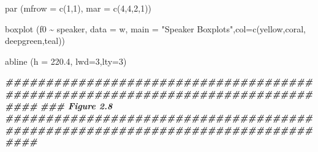 \documentclass[
]{book}
\newenvironment{Shaded}{\begin{snugshade}}{\end{snugshade}}
\newcommand{\AttributeTok}[1]{\textcolor[rgb]{0.77,0.63,0.00}{#1}}
\newcommand{\DecValTok}[1]{\textcolor[rgb]{0.00,0.00,0.81}{#1}}
\newcommand{\DocumentationTok}[1]{\textcolor[rgb]{0.56,0.35,0.01}{\textbf{\textit{#1}}}}
\newcommand{\FloatTok}[1]{\textcolor[rgb]{0.00,0.00,0.81}{#1}}
\newcommand{\FunctionTok}[1]{\textcolor[rgb]{0.00,0.00,0.00}{#1}}
\newcommand{\NormalTok}[1]{#1}
\newcommand{\SpecialCharTok}[1]{\textcolor[rgb]{0.00,0.00,0.00}{#1}}
\newcommand{\StringTok}[1]{\textcolor[rgb]{0.31,0.60,0.02}{#1}}
\begin{document}
\begin{Shaded}
\begin{Highlighting}[]
\FunctionTok{par}\NormalTok{ (}\AttributeTok{mfrow =} \FunctionTok{c}\NormalTok{(}\DecValTok{1}\NormalTok{,}\DecValTok{1}\NormalTok{), }\AttributeTok{mar =} \FunctionTok{c}\NormalTok{(}\DecValTok{4}\NormalTok{,}\DecValTok{4}\NormalTok{,}\DecValTok{2}\NormalTok{,}\DecValTok{1}\NormalTok{))}

\FunctionTok{boxplot}\NormalTok{ (f0 }\SpecialCharTok{\textasciitilde{}}\NormalTok{ speaker, }\AttributeTok{data =}\NormalTok{ w, }\AttributeTok{main =} \StringTok{"Speaker Boxplots"}\NormalTok{,}\AttributeTok{col=}\FunctionTok{c}\NormalTok{(yellow,coral,}
\NormalTok{         deepgreen,teal)) }

\FunctionTok{abline}\NormalTok{ (}\AttributeTok{h =} \FloatTok{220.4}\NormalTok{, }\AttributeTok{lwd=}\DecValTok{3}\NormalTok{,}\AttributeTok{lty=}\DecValTok{3}\NormalTok{)}

\DocumentationTok{\#\#\#\#\#\#\#\#\#\#\#\#\#\#\#\#\#\#\#\#\#\#\#\#\#\#\#\#\#\#\#\#\#\#\#\#\#\#\#\#\#\#\#\#\#\#\#\#\#\#\#\#\#\#\#\#\#\#\#\#\#\#\#\#\#\#\#\#\#\#\#\#\#\#\#\#\#\#\#\#}
\DocumentationTok{\#\#\# Figure 2.8}
\DocumentationTok{\#\#\#\#\#\#\#\#\#\#\#\#\#\#\#\#\#\#\#\#\#\#\#\#\#\#\#\#\#\#\#\#\#\#\#\#\#\#\#\#\#\#\#\#\#\#\#\#\#\#\#\#\#\#\#\#\#\#\#\#\#\#\#\#\#\#\#\#\#\#\#\#\#\#\#\#\#\#\#\#}


\end{Highlighting}
\end{Shaded}
\end{document}
